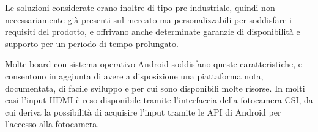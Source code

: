 Le soluzioni considerate erano inoltre di tipo pre-industriale, quindi non necessariamente già presenti sul mercato ma personalizzabili per soddisfare i requisiti del prodotto, e offrivano anche determinate garanzie di disponibilità e supporto per un periodo di tempo prolungato.

Molte board con sistema operativo Android soddisfano queste caratteristiche, e consentono in aggiunta di avere a disposizione una piattaforma nota, documentata, di facile sviluppo e per cui sono disponibili molte risorse. In molti casi l'input HDMI è reso disponibile tramite l'interfaccia della fotocamera CSI, da cui deriva la possibilità di acquisire l'input tramite le API di Android per l'accesso alla fotocamera.

